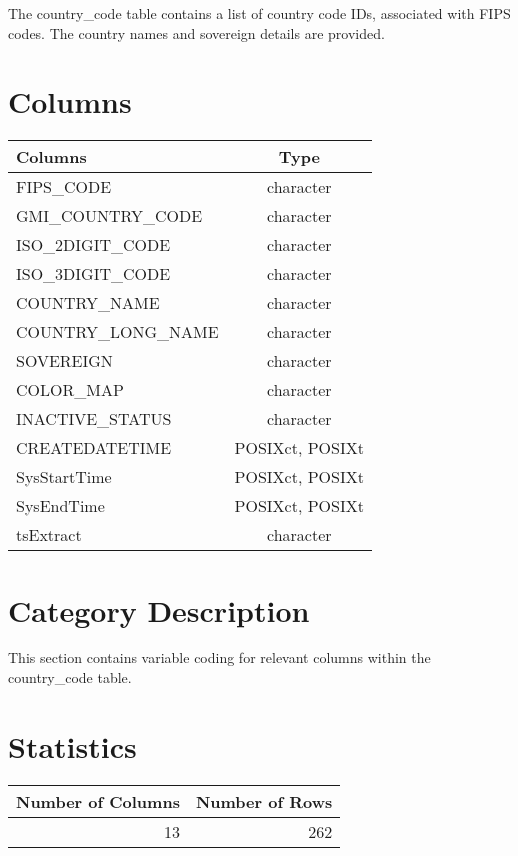 \documentclass[
  letterpaper,
  DIV=11,
  numbers=noendperiod]{scrreprt}
\begin{document}
The country\_code table contains a list of country code IDs, associated
with FIPS codes. The country names and sovereign details are provided.

\hypertarget{columns-5}{%
\section*{Columns}\label{columns-5}}

\begin{longtable}{lc}
\toprule
Columns & Type \\ 
\midrule
FIPS\_CODE & character \\ 
GMI\_COUNTRY\_CODE & character \\ 
ISO\_2DIGIT\_CODE & character \\ 
ISO\_3DIGIT\_CODE & character \\ 
COUNTRY\_NAME & character \\ 
COUNTRY\_LONG\_NAME & character \\ 
SOVEREIGN & character \\ 
COLOR\_MAP & character \\ 
INACTIVE\_STATUS & character \\ 
CREATEDATETIME & POSIXct, POSIXt \\ 
SysStartTime & POSIXct, POSIXt \\ 
SysEndTime & POSIXct, POSIXt \\ 
tsExtract & character \\ 
\bottomrule
\end{longtable}

\hypertarget{category-description-5}{%
\section*{Category Description}\label{category-description-5}}

This section contains variable coding for relevant columns within the
country\_code table.

\hypertarget{statistics-5}{%
\section*{Statistics}\label{statistics-5}}

\begin{longtable}{rr}
\toprule
Number of Columns & Number of Rows \\ 
\midrule
13 & 262 \\ 
\bottomrule
\end{longtable}
\end{document}
